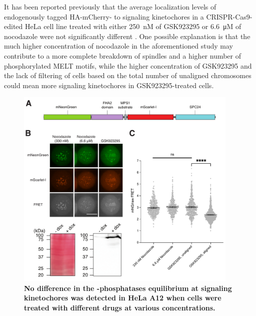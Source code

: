 It has been reported previously that the average localization levels of endogenously tagged HA-mCherry- to signaling kinetochores in a CRISPR-Cas9-edited HeLa cell line treated with either \SI{250}{nM} of GSK923295 or \SI{6.6}{\micro M} of nocodazole were not significantly different \cite{MPS1senor}. One possible explanation is that the much higher concentration of nocodazole in the aforementioned study may contribute to a more complete breakdown of spindles and a higher number of phosphorylated MELT motifs, while the higher concentration of GSK923295 and the lack of filtering of cells based on the total number of unaligned chromosomes could mean more signaling kinetochores in GSK923295-treated cells.

\begin{figure}
    \centering
    \includegraphics[width=0.95\textwidth]{chapters/figures/MPS1sen-KT.pdf}
    \caption{\textbf{No difference in the -phosphatases equilibrium at signaling kinetochores was detected in HeLa A12 when cells were treated with different drugs at various concentrations.}}

\end{figure}
